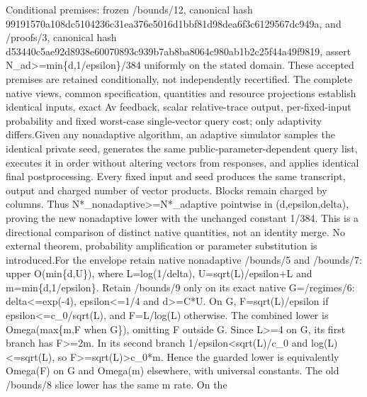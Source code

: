 \documentclass[10pt,a4paper]{article}
\begin{document}
\begingroup\raggedright\sloppy Conditional premises:\allowbreak{} frozen /\allowbreak{}bounds/\allowbreak{}12,\allowbreak{} canonical hash 99191570a108dc5104236c31ea376e5016d1bbf81d98dea6f3c6129567dc949a,\allowbreak{} and /\allowbreak{}proofs/\allowbreak{}3,\allowbreak{} canonical hash d53440c5ae92d8938e60070893c939b7ab8ba8064c980ab1b2c25f44a49f9819,\allowbreak{} assert N\_\allowbreak{}ad>=\allowbreak{}min\{d,\allowbreak{}1/\allowbreak{}epsilon\}/\allowbreak{}384 uniformly on the stated domain. These accepted premises are retained conditionally,\allowbreak{} not independently recertified. The complete native views,\allowbreak{} common specification,\allowbreak{} quantities and resource projections establish identical inputs,\allowbreak{} exact Av feedback,\allowbreak{} scalar relative-trace output,\allowbreak{} per-fixed-input probability and fixed worst-case single-vector query cost;\allowbreak{} only adaptivity differs.\newline{}Given any nonadaptive algorithm,\allowbreak{} an adaptive simulator samples the identical private seed,\allowbreak{} generates the same public-parameter-dependent query list,\allowbreak{} executes it in order without altering vectors from responses,\allowbreak{} and applies identical final postprocessing. Every fixed input and seed produces the same transcript,\allowbreak{} output and charged number of vector products. Blocks remain charged by columns. Thus N*\_\allowbreak{}nonadaptive>=\allowbreak{}N*\_\allowbreak{}adaptive pointwise in (d,\allowbreak{}epsilon,\allowbreak{}delta),\allowbreak{} proving the new nonadaptive lower with the unchanged constant 1/\allowbreak{}384. This is a directional comparison of distinct native quantities,\allowbreak{} not an identity merge. No external theorem,\allowbreak{} probability amplification or parameter substitution is introduced.\newline{}For the envelope retain native nonadaptive /\allowbreak{}bounds/\allowbreak{}5 and /\allowbreak{}bounds/\allowbreak{}7:\allowbreak{} upper O(min\{d,\allowbreak{}U\}),\allowbreak{} where L=\allowbreak{}log(1/\allowbreak{}delta),\allowbreak{} U=\allowbreak{}sqrt(L)/\allowbreak{}epsilon+L and m=\allowbreak{}min\{d,\allowbreak{}1/\allowbreak{}epsilon\}. Retain /\allowbreak{}bounds/\allowbreak{}9 only on its exact native G=\allowbreak{}/\allowbreak{}regimes/\allowbreak{}6:\allowbreak{} delta<=\allowbreak{}exp(-4),\allowbreak{} epsilon<=\allowbreak{}1/\allowbreak{}4 and d>=\allowbreak{}C*U. On G,\allowbreak{} F=\allowbreak{}sqrt(L)/\allowbreak{}epsilon if epsilon<=\allowbreak{}c\_\allowbreak{}0/\allowbreak{}sqrt(L),\allowbreak{} and F=\allowbreak{}L/\allowbreak{}log(L) otherwise. The combined lower is Omega(max\{m,\allowbreak{}F when G\}),\allowbreak{} omitting F outside G. Since L>=\allowbreak{}4 on G,\allowbreak{} its first branch has F>=\allowbreak{}2m. In its second branch 1/\allowbreak{}epsilon<sqrt(L)/\allowbreak{}c\_\allowbreak{}0 and log(L)<=\allowbreak{}sqrt(L),\allowbreak{} so F>=\allowbreak{}sqrt(L)>c\_\allowbreak{}0*m. Hence the guarded lower is equivalently Omega(F) on G and Omega(m) elsewhere,\allowbreak{} with universal constants. The old /\allowbreak{}bounds/\allowbreak{}8 slice lower has the same m rate. On the 
\end{document}
